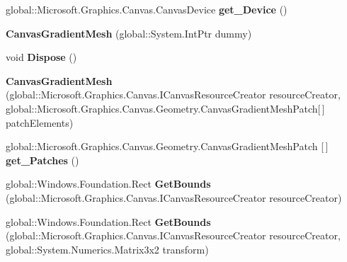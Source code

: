 \begin{DoxyCompactItemize}
global\+::\+Microsoft.\+Graphics.\+Canvas.\+Canvas\+Device {\bfseries get\+\_\+\+Device} ()
\item 
\mbox{\label{class_microsoft_1_1_graphics_1_1_canvas_1_1_geometry_1_1_canvas_gradient_mesh_a7284f7e93f2c21e5bad79e6bbae86e49}} 
{\bfseries Canvas\+Gradient\+Mesh} (global\+::\+System.\+Int\+Ptr dummy)
\item 
\mbox{\label{class_microsoft_1_1_graphics_1_1_canvas_1_1_geometry_1_1_canvas_gradient_mesh_aff29d3a0c6889d589409c3bd3402cb7c}} 
void {\bfseries Dispose} ()
\item 
\mbox{\label{class_microsoft_1_1_graphics_1_1_canvas_1_1_geometry_1_1_canvas_gradient_mesh_a6677d365775f86d865af80a34d58b31d}} 
{\bfseries Canvas\+Gradient\+Mesh} (global\+::\+Microsoft.\+Graphics.\+Canvas.\+I\+Canvas\+Resource\+Creator resource\+Creator, global\+::\+Microsoft.\+Graphics.\+Canvas.\+Geometry.\+Canvas\+Gradient\+Mesh\+Patch\mbox{[}$\,$\mbox{]} patch\+Elements)
\item 
\mbox{\label{class_microsoft_1_1_graphics_1_1_canvas_1_1_geometry_1_1_canvas_gradient_mesh_ad14c223648421f65d2cbd4de1c1b0877}} 
global\+::\+Microsoft.\+Graphics.\+Canvas.\+Geometry.\+Canvas\+Gradient\+Mesh\+Patch \mbox{[}$\,$\mbox{]} {\bfseries get\+\_\+\+Patches} ()
\item 
\mbox{\label{class_microsoft_1_1_graphics_1_1_canvas_1_1_geometry_1_1_canvas_gradient_mesh_a3239426176127d3d80193f667dcd34f8}} 
global\+::\+Windows.\+Foundation.\+Rect {\bfseries Get\+Bounds} (global\+::\+Microsoft.\+Graphics.\+Canvas.\+I\+Canvas\+Resource\+Creator resource\+Creator)
\item 
\mbox{\label{class_microsoft_1_1_graphics_1_1_canvas_1_1_geometry_1_1_canvas_gradient_mesh_a446144d0cc83e13b8dab0cb1b480a549}} 
global\+::\+Windows.\+Foundation.\+Rect {\bfseries Get\+Bounds} (global\+::\+Microsoft.\+Graphics.\+Canvas.\+I\+Canvas\+Resource\+Creator resource\+Creator, global\+::\+System.\+Numerics.\+Matrix3x2 transform)

\end{DoxyCompactItemize}
